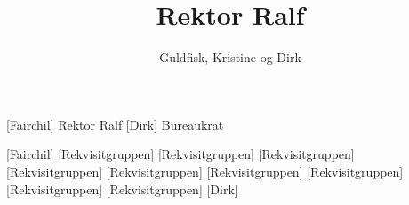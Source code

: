 \documentclass[a4paper,11pt]{article}
\title{Rektor Ralf}
\author{Guldfisk, Kristine og Dirk}
\begin{document}
\maketitle

\begin{roles}
[Fairchil] Rektor Ralf
[Dirk] Bureaukrat
\end{roles}

\begin{props}
[Fairchil]
[Rekvisitgruppen]
[Rekvisitgruppen]
[Rekvisitgruppen]
[Rekvisitgruppen]
[Rekvisitgruppen]
[Rekvisitgruppen]
[Rekvisitgruppen]
[Rekvisitgruppen]
[Rekvisitgruppen]
[Dirk]
\end{props}
\end{document}

